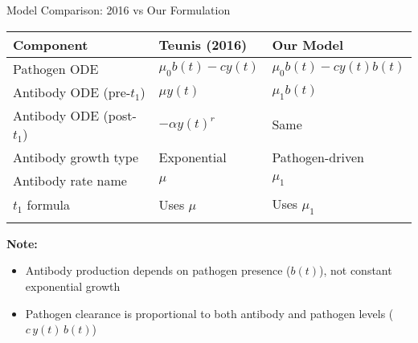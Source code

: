 \documentclass[
  ignorenonframetext,
]{beamer}
\providecommand{\tightlist}{%
  \setlength{\itemsep}{0pt}\setlength{\parskip}{0pt}}\usepackage{longtable,booktabs,array}
\begin{document}
\begin{frame}{Model Comparison: 2016 vs Our Formulation}
\label{model-comparison-2016-vs-our-formulation}
\begin{longtable}[]{@{}lll@{}}
\toprule\noalign{}
\textbf{Component} & \textbf{Teunis (2016)} & \textbf{Our Model} \\
\midrule\noalign{}
\endhead
Pathogen ODE & \(\mu_0 b(t) - c y(t)\) & \(\mu_0 b(t) - c y(t) b(t)\) \\
Antibody ODE (pre-\(t_1\)) & \(\mu y(t)\) & \(\mu_1 b(t)\) \\
Antibody ODE (post-\(t_1\)) & \(-\alpha y(t)^r\) & Same \\
Antibody growth type & Exponential & Pathogen-driven \\
Antibody rate name & \(\mu\) & \(\mu_1\) \\
\(t_1\) formula & Uses \(\mu\) & Uses \(\mu_1\) \\
\bottomrule\noalign{}
\end{longtable}

\textbf{Note:}

\begin{itemize}
\tightlist
\item
  Antibody production depends on pathogen presence (\(b(t)\)), not
  constant exponential growth\\
\item
  Pathogen clearance is proportional to both antibody and pathogen
  levels (\(c\,y(t)\,b(t)\))
\end{itemize}
\end{frame}
\end{document}
